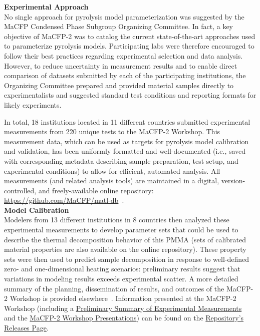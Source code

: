 \documentclass[12pt]{article}
\begin{document}
\textbf{Experimental Approach}\\
No single approach for pyrolysis model parameterization was suggested by the MaCFP Condensed Phase Subgroup Organizing Committee. In fact, a key objective of MaCFP-2 was to catalog the current state-of-the-art approaches used to parameterize pyrolysis models. Participating labs were therefore encouraged to follow their best practices regarding experimental selection and data analysis. However, to reduce uncertainty in measurement results and to enable direct comparison of datasets submitted by each of the participating institutions, the Organizing Committee prepared and provided material samples directly to experimentalists and suggested standard test conditions and reporting formats for likely experiments.  

In total, 18 institutions located in 11 different countries submitted experimental measurements from 220 unique tests to the MaCFP-2 Workshop. This measurement data, which can be used as targets for pyrolysis model calibration and validation, has been uniformly formatted and well-documented (i.e., saved with corresponding metadata describing sample preparation, test setup, and experimental conditions) to allow for efficient, automated analysis. All measurements (and related analysis tools) are maintained in a digital, version-controlled, and freely-available online repository: \url{https://github.com/MaCFP/matl-db}~\cite{MaCFP-cond-db}. \\

\textbf{Model Calibration}\\
Modelers from 13 different institutions in 8 countries then analyzed these experimental measurements to develop parameter sets that could be used to describe the thermal decomposition behavior of this PMMA (sets of calibrated material properties are also available on the online repository). These property sets were then used to predict sample decomposition in response to well-defined zero- and one-dimensional heating scenarios: preliminary results suggest that variations in modeling results exceeds experimental scatter.  A more detailed summary of the planning, dissemination of results, and outcomes of the MaCFP-2 Workshop is provided elsewhere~\cite{Leventon2022ASTM}. Information presented at the MaCFP-2 Workshop (including a \href{https://github.com/MaCFP/matl-db/releases/tag/v1.0.0}{Preliminary Summary of Experimental Measurements}~\cite{PreliminarySummary} and the \href{https://github.com/MaCFP/matl-db/releases/tag/v1.1.0}{MaCFP-2 Workshop Presentations}) can be found on the 
\href{https://github.com/MaCFP/matl-db/releases}{Repository's Releases Page}.
\end{document}
